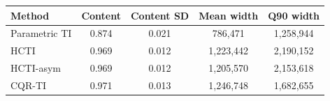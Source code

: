 \begin{tabular}{lcccc}
\toprule
Method & Content & Content SD & Mean width & Q90 width \\
\midrule
Parametric TI & 0.874 & 0.021 & 786,471 & 1,258,944 \\
HCTI & 0.969 & 0.012 & 1,223,442 & 2,190,152 \\
HCTI-asym & 0.969 & 0.012 & 1,205,570 & 2,153,618 \\
CQR-TI & 0.971 & 0.013 & 1,246,748 & 1,682,655 \\
\bottomrule
\end{tabular}